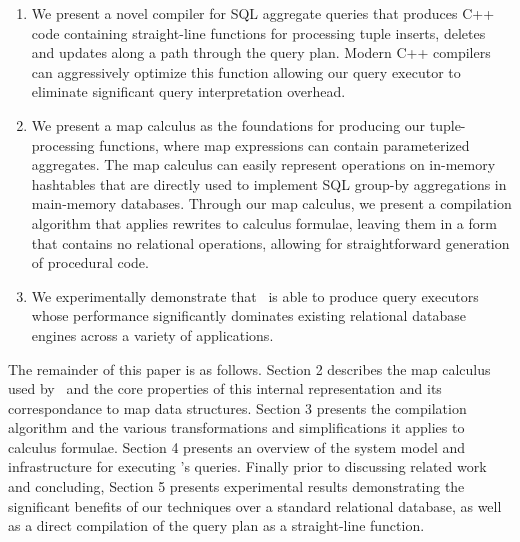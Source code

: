 \begin{enumerate}
  \item We present a novel compiler for SQL aggregate queries that produces C++
code containing straight-line functions for processing tuple inserts, deletes
and updates along a path through the query plan. Modern C++ compilers can
aggressively optimize this function allowing our query executor to eliminate
significant query interpretation overhead.
  \item We present a map calculus as the foundations for producing our
tuple-processing functions, where map expressions can contain parameterized
aggregates. The map calculus can easily represent operations on in-memory
hashtables that are directly used to implement SQL group-by aggregations in
main-memory data\-ba\-ses. Through our map calculus, we present a compilation
algorithm that applies rewrites to calculus formulae, leaving them in a
form that contains no relational operations, allowing for straightforward
generation of procedural code.
  \item We experimentally demonstrate that \compiler\ is able to produce query
executors whose performance significantly dominates existing relational database
engines across a variety of applications.
\end{enumerate}

The remainder of this paper is as follows. Section 2 describes the map calculus
used by \compiler\ and the core properties of this internal representation and
its correspondance to map data structures. Section 3 presents the compilation
algorithm and the various transformations and simplifications it applies to
calculus formulae. Section 4 presents an overview of the system model and
infrastructure for executing \compiler's queries. Finally prior to discussing
related work and concluding, Section 5 presents experimental results
demonstrating the significant benefits of our techniques over a standard
relational database, as well as a direct compilation of the query plan as a
straight-line function.
